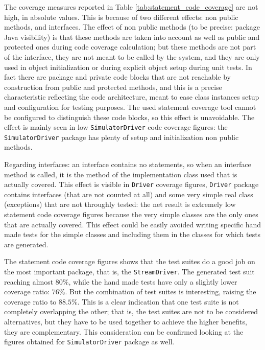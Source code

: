 \documentclass{article} \usepackage{times}
\newcommand{\lil}[1]{\texttt{\lstinline|#1|}}
\begin{document}
The coverage measures reported in Table
\ref{tab:statement_code_coverage} are not high, in absolute
values. This is because of two different effects: non public methods,
and interfaces. The effect of non public methods (to be precise:
package Java visibility) is that these methods are taken into account
as well as public and protected ones during code coverage calculation;
but these methods are not part of the interface, they are not meant to
be called by the system, and they are only used in object
initialization or during explicit object setup during unit tests. In
fact there are package and private code blocks that are not reachable
by construction from public and protected methods, and this is a
precise characteristic reflecting the code architecture, meant to ease
class instances setup and configuration for testing purposes. The used
statement coverage tool cannot be configured to distinguish these code
blocks, so this effect is unavoidable. The effect is mainly seen in
low \lil{SimulatorDriver} code coverage figures: the
\lil{SimulatorDriver} package has plenty of setup and initialization
non public methods.

Regarding interfaces: an interface contains no statements, so when an
interface method is called, it is the method of the implementation
class used that is actually covered. This effect is visible in
\lil{Driver} coverage figures, \lil{Driver} package contains
interfaces (that are not counted at all) and some very simple real
class (exceptions) that are not throughly tested: the net result is
extremely low statement code coverage figures because the very simple
classes are the only ones that are actually covered. This effect could
be easily avoided writing specific hand made tests for the simple
classes and including them in the classes for which tests are
generated.

The statement code coverage figures shows that the test suites do a
good job on the most important package, that is, the
\lil{StreamDriver}. The generated test suit reaching almost $ 80 \% $,
while the hand made tests have only a slightly lower coverage ratio: $
76 \% $. But the combination of test suites is interesting, raising
the coverage ratio to $ 88.5 \% $. This is a clear indication that one
test suite is not completely overlapping the other; that is, the test
suites are not to be considered alternatives, but they have to be used
together to achieve the higher benefits, they are complementary. This
consideration can be confirmed looking at the figures obtained for
\lil{SimulatorDriver} package as well.
\end{document}
